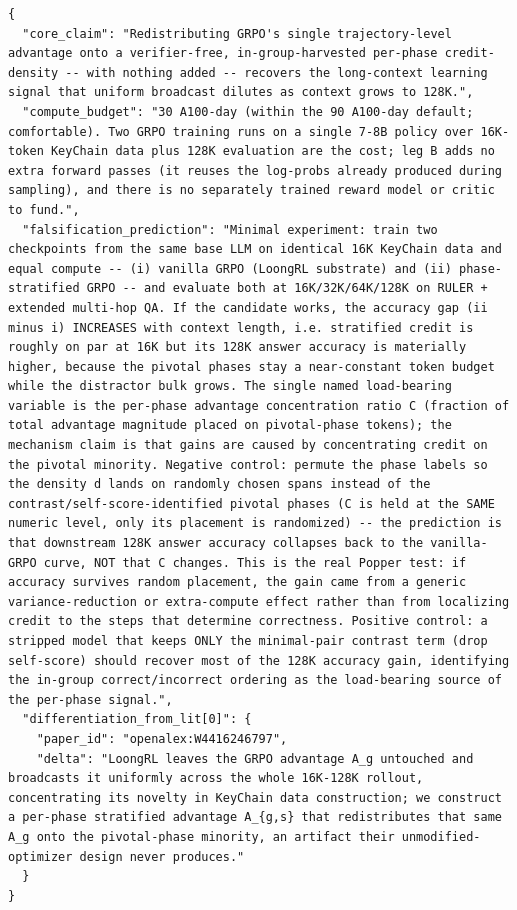 \begin{lstlisting}[breaklines=true,basicstyle=\ttfamily\footnotesize,frame=single,framerule=0.4pt,xleftmargin=4pt,xrightmargin=4pt,aboveskip=4pt,belowskip=2pt]
{
  "core_claim": "Redistributing GRPO's single trajectory-level advantage onto a verifier-free, in-group-harvested per-phase credit-density -- with nothing added -- recovers the long-context learning signal that uniform broadcast dilutes as context grows to 128K.",
  "compute_budget": "30 A100-day (within the 90 A100-day default; comfortable). Two GRPO training runs on a single 7-8B policy over 16K-token KeyChain data plus 128K evaluation are the cost; leg B adds no extra forward passes (it reuses the log-probs already produced during sampling), and there is no separately trained reward model or critic to fund.",
  "falsification_prediction": "Minimal experiment: train two checkpoints from the same base LLM on identical 16K KeyChain data and equal compute -- (i) vanilla GRPO (LoongRL substrate) and (ii) phase-stratified GRPO -- and evaluate both at 16K/32K/64K/128K on RULER + extended multi-hop QA. If the candidate works, the accuracy gap (ii minus i) INCREASES with context length, i.e. stratified credit is roughly on par at 16K but its 128K answer accuracy is materially higher, because the pivotal phases stay a near-constant token budget while the distractor bulk grows. The single named load-bearing variable is the per-phase advantage concentration ratio C (fraction of total advantage magnitude placed on pivotal-phase tokens); the mechanism claim is that gains are caused by concentrating credit on the pivotal minority. Negative control: permute the phase labels so the density d lands on randomly chosen spans instead of the contrast/self-score-identified pivotal phases (C is held at the SAME numeric level, only its placement is randomized) -- the prediction is that downstream 128K answer accuracy collapses back to the vanilla-GRPO curve, NOT that C changes. This is the real Popper test: if accuracy survives random placement, the gain came from a generic variance-reduction or extra-compute effect rather than from localizing credit to the steps that determine correctness. Positive control: a stripped model that keeps ONLY the minimal-pair contrast term (drop self-score) should recover most of the 128K accuracy gain, identifying the in-group correct/incorrect ordering as the load-bearing source of the per-phase signal.",
  "differentiation_from_lit[0]": {
    "paper_id": "openalex:W4416246797",
    "delta": "LoongRL leaves the GRPO advantage A_g untouched and broadcasts it uniformly across the whole 16K-128K rollout, concentrating its novelty in KeyChain data construction; we construct a per-phase stratified advantage A_{g,s} that redistributes that same A_g onto the pivotal-phase minority, an artifact their unmodified-optimizer design never produces."
  }
}
\end{lstlisting}

